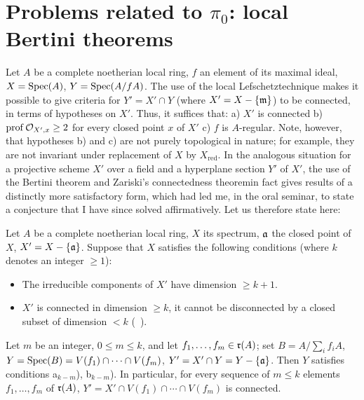 \section{\texorpdfstring{Problems related to $\pi_0$: local Bertini theorems}{Problems related to pi: local Bertini theorems}} \label{XIII.2}

Let $A$ be a complete noetherian local ring, $f$ an element of its
maximal ideal, $X=\operatorname{Spec} (A)$, $Y=\operatorname{Spec}(A/fA)$. The use of the local
\og Lefschetz\fg technique makes it possible to give criteria
for $Y'=X'\cap Y$ (where $X'=X-\{\mathfrak{m}\}$) to be connected, in terms
of hypotheses on $X'$. Thus, it suffices that: a) $X'$\pageoriginale
is connected\sisi{}{,} b) $\operatorname{prof} \mathcal O_{X', x} \ge 2$ for every closed point $x$
of $X'$\sisi{}{,} c) $f$ is $A$-regular. Note, however, that
hypotheses b) and c) are not purely
topological in nature; for example, they are not invariant\sisi{}{}
under replacement of $X$ by $X_{\text{red}}$. In the analogous situation
for a projective scheme $X'$ over a field and a hyperplane
section $Y'$ of $X'$, the use of the \og Bertini theorem\fg
and Zariski's \og connectedness theorem\fg in fact gives
results of a distinctly more satisfactory form,
which had led me, in the oral seminar, to state
a conjecture that I have since solved affirmatively.
Let us therefore state here:

\begin{theoreme} \label{XIII.2.1}
Let $A$ be a complete noetherian local ring, $X$ its spectrum, $\mathfrak{a}$ the closed point of $X$, $X'=X-\{ \mathfrak{a}\}$. Suppose that $X$ satisfies the following conditions (where $k$ denotes an integer $\ge 1$):
\begin{itemize}
\item[a$_k$)] The irreducible components of $X'$ have dimension $\ge k+1$.

\item[b$_k$)] $X'$ is connected in dimension $\ge k$, \ie it cannot be disconnected by a closed subset of dimension $<k$ (\cf {}~).
\end{itemize}

Let $m$ be an integer, $0\le m\le k$, and let $f_1, \dotsc, f_m\in \mathfrak{r}(A)$; set $B=A/\sum_i f_iA$, $Y=\operatorname{Spec}(B)=V(f_1)\cap\dotsb\cap V(f_m)$, $Y'=X'\cap Y=Y-\{\mathfrak{a}\}$. Then $Y$ satisfies conditions a$_{k-m}$), b$_{k-m}$). In particular, for every sequence of $m\le k$ elements $f_1, \dotsc, f_m$ of $\mathfrak{r}(A)$, $Y'=X'\cap V(f_1)\cap\dotsb\cap V(f_m)$ is connected.
\end{theoreme}

